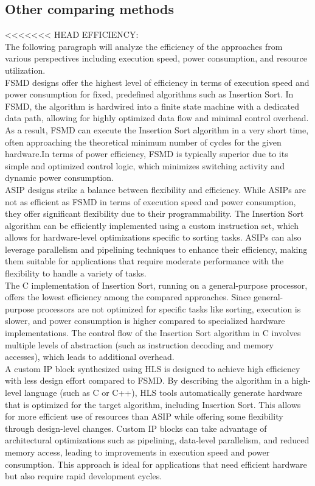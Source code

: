 \documentclass[conference]{IEEEtran}
\begin{document}
\subsection{Other comparing methods}
<<<<<<< HEAD
EFFICIENCY:\\
The following paragraph will analyze the efficiency of the approaches from various perspectives including execution speed, power consumption, and resource utilization.\\
FSMD designs offer the highest level of efficiency in terms of execution speed and power consumption for fixed, predefined algorithms such as Insertion Sort. In FSMD, the algorithm is hardwired into a finite state machine with a dedicated data path, allowing for highly optimized data flow and minimal control overhead. As a result, FSMD can execute the Insertion Sort algorithm in a very short time, often approaching the theoretical minimum number of cycles for the given hardware.In terms of power efficiency, FSMD is typically superior due to its simple and optimized control logic, which minimizes switching activity and dynamic power consumption.\\
ASIP designs strike a balance between flexibility and efficiency. While ASIPs are not as efficient as FSMD in terms of execution speed and power consumption, they offer significant flexibility due to their programmability. The Insertion Sort algorithm can be efficiently implemented using a custom instruction set, which allows for hardware-level optimizations specific to sorting tasks. ASIPs can also leverage parallelism and pipelining techniques to enhance their efficiency, making them suitable for applications that require moderate performance with the flexibility to handle a variety of tasks.\\
The C implementation of Insertion Sort, running on a general-purpose processor, offers the lowest efficiency among the compared approaches. Since general-purpose processors are not optimized for specific tasks like sorting, execution is slower, and power consumption is higher compared to specialized hardware implementations. The control flow of the Insertion Sort algorithm in C involves multiple levels of abstraction (such as instruction decoding and memory accesses), which leads to additional overhead.\\
A custom IP block synthesized using HLS is designed to achieve high efficiency with less design effort compared to FSMD. By describing the algorithm in a high-level language (such as C or C++), HLS tools automatically generate hardware that is optimized for the target algorithm, including Insertion Sort. This allows for more efficient use of resources than ASIP while offering some flexibility through design-level changes. Custom IP blocks can take advantage of architectural optimizations such as pipelining, data-level parallelism, and reduced memory access, leading to improvements in execution speed and power consumption. This approach is ideal for applications that need efficient hardware but also require rapid development cycles.\\
\end{document}
